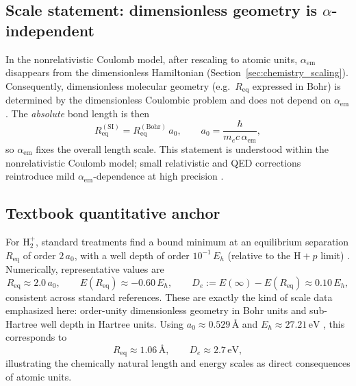 \subsection{Scale statement: dimensionless geometry is \texorpdfstring{$\alpha$}{alpha}-independent}
In the nonrelativistic Coulomb model, after rescaling to atomic units, $\alpha_{\mathrm{em}}$ disappears from the dimensionless Hamiltonian (Section~\ref{sec:chemistry_scaling}). Consequently, dimensionless molecular geometry (e.g.\ $R_{\mathrm{eq}}$ expressed in Bohr) is determined by the dimensionless Coulombic problem and does not depend on $\alpha_{\mathrm{em}}$. The \emph{absolute} bond length is then
\[
R_{\mathrm{eq}}^{(\mathrm{SI})}=R_{\mathrm{eq}}^{(\mathrm{Bohr})}\,a_0,
\qquad
a_0=\frac{\hbar}{m_e c\,\alpha_{\mathrm{em}}},
\]
so $\alpha_{\mathrm{em}}$ fixes the overall length scale.
This statement is understood within the nonrelativistic Coulomb model; small relativistic and QED corrections reintroduce mild $\alpha_{\mathrm{em}}$-dependence at high precision \cite{AtkinsFriedman2011}.

\subsection{Textbook quantitative anchor}
For $\mathrm{H}_2^+$, standard treatments find a bound minimum at an equilibrium separation $R_{\mathrm{eq}}$ of order $2\,a_0$, with a well depth of order $10^{-1}\,E_h$ (relative to the $\mathrm{H}+p$ limit) \cite{PaulingWilson1935,AtkinsFriedman2011}. Numerically, representative values are
\[
R_{\mathrm{eq}}\approx 2.0\,a_0,
\qquad
E(R_{\mathrm{eq}})\approx -0.60\,E_h,
\qquad
D_e:=E(\infty)-E(R_{\mathrm{eq}})\approx 0.10\,E_h,
\]
consistent across standard references. These are exactly the kind of scale data emphasized here: order-unity dimensionless geometry in Bohr units and sub-Hartree well depth in Hartree units.
Using $a_0\approx 0.529\,\text{\AA}$ and $E_h\approx 27.21\,\mathrm{eV}$ \cite{CODATA2022RMP}, this corresponds to
\[
R_{\mathrm{eq}}\approx 1.06\,\text{\AA},
\qquad
D_e\approx 2.7\,\mathrm{eV},
\]
illustrating the chemically natural length and energy scales as direct consequences of atomic units.

